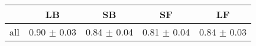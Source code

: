 \begin{tabular}{c c c c c }
\hline
 & LB & SB & SF & LF \\
\hline
all & 0.90 $\pm$ 0.03 & 0.84 $\pm$ 0.04 & 0.81 $\pm$ 0.04 & 0.84 $\pm$ 0.03 \\
\hline
\end{tabular}